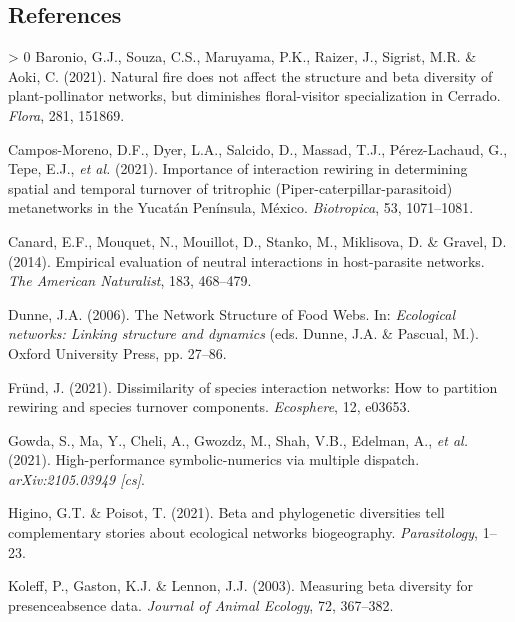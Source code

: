 \documentclass[11pt]{article}
\newlength{\cslhangindent}
\newenvironment{CSLReferences}[3] %
 {%
  \setlength{\parindent}{0pt}
  \ifodd #1 \everypar{\setlength{\hangindent}{\cslhangindent}}\ignorespaces\fi
  \ifnum #2 > 0
  \setlength{\parskip}{#2\baselineskip}
  \fi
 }%
 {}
\begin{document}
\hypertarget{references}{%
\subsection*{References}\label{references}}

\hypertarget{refs}{}
\begin{CSLReferences}{1}{0}
\leavevmode\hypertarget{ref-Baronio2021NatFir}{}%
Baronio, G.J., Souza, C.S., Maruyama, P.K., Raizer, J., Sigrist, M.R. \&
Aoki, C. (2021). Natural fire does not affect the structure and beta
diversity of plant-pollinator networks, but diminishes floral-visitor
specialization in Cerrado. \emph{Flora}, 281, 151869.

\leavevmode\hypertarget{ref-Campos-Moreno2021ImpInt}{}%
Campos-Moreno, D.F., Dyer, L.A., Salcido, D., Massad, T.J.,
Pérez-Lachaud, G., Tepe, E.J., \emph{et al.} (2021). Importance of
interaction rewiring in determining spatial and temporal turnover of
tritrophic (Piper-caterpillar-parasitoid) metanetworks in the Yucatán
Península, México. \emph{Biotropica}, 53, 1071--1081.

\leavevmode\hypertarget{ref-Canard2014EmpEva}{}%
Canard, E.F., Mouquet, N., Mouillot, D., Stanko, M., Miklisova, D. \&
Gravel, D. (2014). Empirical evaluation of neutral interactions in
host-parasite networks. \emph{The American Naturalist}, 183, 468--479.

\leavevmode\hypertarget{ref-Dunne2006NetStr}{}%
Dunne, J.A. (2006). The Network Structure of Food Webs. In:
\emph{Ecological networks: Linking structure and dynamics} (eds. Dunne,
J.A. \& Pascual, M.). Oxford University Press, pp. 27--86.

\leavevmode\hypertarget{ref-Frund2021DisSpe}{}%
Fründ, J. (2021). Dissimilarity of species interaction networks: How to
partition rewiring and species turnover components. \emph{Ecosphere},
12, e03653.

\leavevmode\hypertarget{ref-Gowda2021HigSym}{}%
Gowda, S., Ma, Y., Cheli, A., Gwozdz, M., Shah, V.B., Edelman, A.,
\emph{et al.} (2021). High-performance symbolic-numerics via multiple
dispatch. \emph{arXiv:2105.03949 {[}cs{]}}.

\leavevmode\hypertarget{ref-Higino2021BetPhy}{}%
Higino, G.T. \& Poisot, T. (2021). Beta and phylogenetic diversities
tell complementary stories about ecological networks biogeography.
\emph{Parasitology}, 1--23.

\leavevmode\hypertarget{ref-Koleff2003MeaBet}{}%
Koleff, P., Gaston, K.J. \& Lennon, J.J. (2003). Measuring beta
diversity for presenceabsence data. \emph{Journal of Animal Ecology},
72, 367--382.


\end{CSLReferences}
\end{document}
